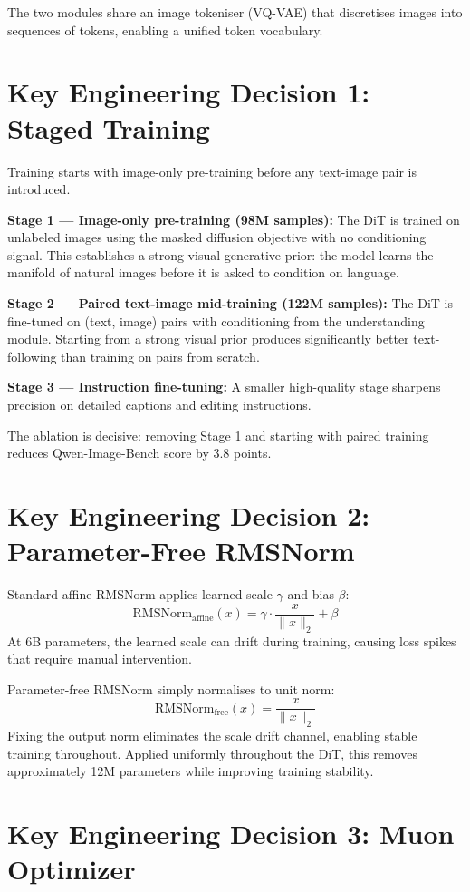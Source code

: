 \documentclass[10pt,twocolumn]{article}
\begin{document}
The two modules share an image tokeniser (VQ-VAE) that discretises
images into sequences of tokens, enabling a unified token vocabulary.

\section{Key Engineering Decision 1: Staged Training}

Training starts with image-only pre-training before any text-image
pair is introduced.

\textbf{Stage 1 --- Image-only pre-training (98M samples):}
The DiT is trained on unlabeled images using the masked diffusion
objective with no conditioning signal. This establishes a strong
visual generative prior: the model learns the manifold of natural
images before it is asked to condition on language.

\textbf{Stage 2 --- Paired text-image mid-training (122M samples):}
The DiT is fine-tuned on (text, image) pairs with conditioning from
the understanding module. Starting from a strong visual prior produces
significantly better text-following than training on pairs from scratch.

\textbf{Stage 3 --- Instruction fine-tuning:}
A smaller high-quality stage sharpens precision on detailed captions
and editing instructions.

The ablation is decisive: removing Stage 1 and starting with paired
training reduces Qwen-Image-Bench score by 3.8 points.

\section{Key Engineering Decision 2: Parameter-Free RMSNorm}

Standard affine RMSNorm applies learned scale $\gamma$ and bias
$\beta$:
\[
  \text{RMSNorm}_\text{affine}(x) = \gamma \cdot \frac{x}{\|x\|_2} + \beta
\]
At 6B parameters, the learned scale can drift during training, causing
loss spikes that require manual intervention.

Parameter-free RMSNorm simply normalises to unit norm:
\[
  \text{RMSNorm}_\text{free}(x) = \frac{x}{\|x\|_2}
\]
Fixing the output norm eliminates the scale drift channel, enabling
stable training throughout. Applied uniformly throughout the DiT,
this removes approximately 12M parameters while improving training
stability.

\section{Key Engineering Decision 3: Muon Optimizer}
\end{document}
